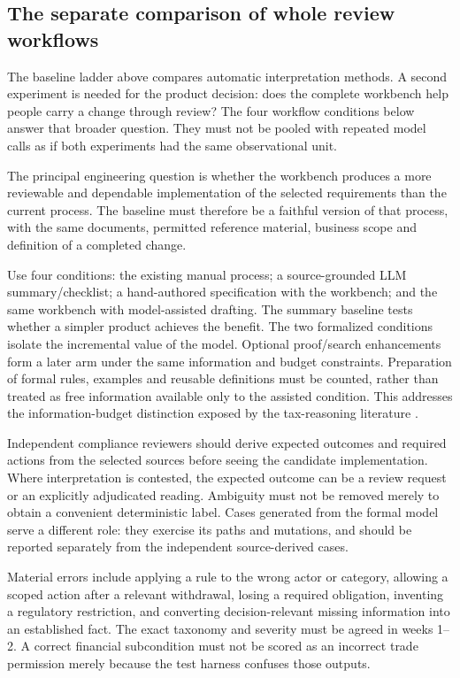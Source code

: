 \subsection{The separate comparison of whole review workflows}

The baseline ladder above compares automatic interpretation methods. A second
experiment is needed for the product decision: does the complete workbench help
people carry a change through review? The four workflow conditions below answer
that broader question. They must not be pooled with repeated model calls as if
both experiments had the same observational unit.


\label{merge:P-04-prototype:04}


The principal engineering question is whether the workbench produces a more
reviewable and dependable implementation of the selected requirements than the
current process. The baseline must therefore be a faithful version of that
process, with the same documents, permitted reference material, business scope and
definition of a completed change.

Use four conditions: the existing manual process; a source-grounded LLM
summary/checklist; a hand-authored specification with the workbench; and the same
workbench with model-assisted drafting. The summary baseline tests whether a
simpler product achieves the benefit. The two formalized conditions isolate the
incremental value of the model. Optional proof/search enhancements form a later
arm under the same information and budget constraints. Preparation of formal
rules, examples and reusable definitions must be counted, rather than treated as
free information available only to the assisted condition. This addresses the
information-budget distinction exposed by the tax-reasoning literature
\citep{jurayj2026}.

Independent compliance reviewers should derive expected outcomes and required
actions from the selected sources before seeing the candidate implementation.
Where interpretation is contested, the expected outcome can be a review request
or an explicitly adjudicated reading. Ambiguity must not be removed merely to
obtain a convenient deterministic label. Cases generated from the formal model
serve a different role: they exercise its paths and mutations, and should be
reported separately from the independent source-derived cases.

Material errors include applying a rule to the wrong actor or category, allowing
a scoped action after a relevant withdrawal, losing a required obligation,
inventing a regulatory restriction, and converting decision-relevant missing
information into an established fact. The exact taxonomy and severity must be
agreed in weeks 1--2. A correct financial subcondition must not be scored as an
incorrect trade permission merely because the test harness confuses those outputs.

